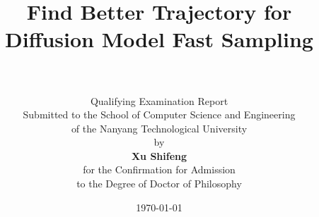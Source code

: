 
\title{\sc
\vspace{-0.5in} Find Better Trajectory for Diffusion Model Fast Sampling\\
\vspace*{0.3in} \centering
{}\\[1em]}

\author{
Qualifying Examination Report\\
Submitted to the School of Computer Science and Engineering\\
of the Nanyang Technological University\\[1em]
by\\[1em]
{\rm\bf Xu Shifeng}\\[1.5em]
for the Confirmation for Admission \\
to the Degree of Doctor of Philosophy\\[1.5em]
}

\date{\today}
\maketitle
\thispagestyle{empty}        %
